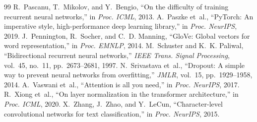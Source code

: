 \begin{thebibliography}{99}
 R.~Pascanu, T.~Mikolov, and Y.~Bengio, ``On the difficulty of training recurrent neural networks,'' in \textit{Proc. ICML}, 2013.
 A.~Paszke et~al., ``PyTorch: An imperative style, high-performance deep learning library,'' in \textit{Proc. NeurIPS}, 2019.
 J.~Pennington, R.~Socher, and C.~D. Manning, ``GloVe: Global vectors for word representation,'' in \textit{Proc. EMNLP}, 2014.
 M.~Schuster and K.~K. Paliwal, ``Bidirectional recurrent neural networks,'' \textit{IEEE Trans. Signal Processing}, vol.~45, no.~11, pp.~2673--2681, 1997.
 N.~Srivastava et~al., ``Dropout: A simple way to prevent neural networks from overfitting,'' \textit{JMLR}, vol.~15, pp.~1929--1958, 2014.
 A.~Vaswani et~al., ``Attention is all you need,'' in \textit{Proc. NeurIPS}, 2017.
 R.~Xiong et~al., ``On layer normalization in the transformer architecture,'' in \textit{Proc. ICML}, 2020.
 X.~Zhang, J.~Zhao, and Y.~LeCun, ``Character-level convolutional networks for text classification,'' in \textit{Proc. NeurIPS}, 2015.
\end{thebibliography}
